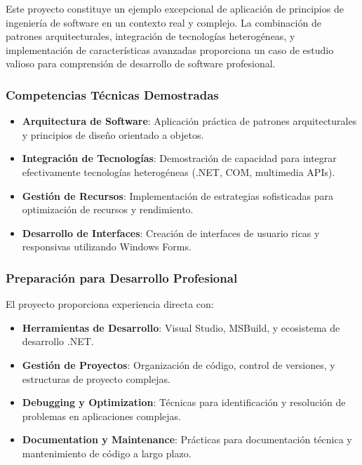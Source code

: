\documentclass[a4paper]{article}
\begin{document}
Este proyecto constituye un ejemplo excepcional de aplicación de principios de ingeniería de software en un contexto real y complejo. La combinación de patrones arquitecturales, integración de tecnologías heterogéneas, y implementación de características avanzadas proporciona un caso de estudio valioso para comprensión de desarrollo de software profesional.

\subsubsection{Competencias Técnicas Demostradas}

\begin{itemize}
\item \textbf{Arquitectura de Software}: Aplicación práctica de patrones arquitecturales y principios de diseño orientado a objetos.

\item \textbf{Integración de Tecnologías}: Demostración de capacidad para integrar efectivamente tecnologías heterogéneas (.NET, COM, multimedia APIs).

\item \textbf{Gestión de Recursos}: Implementación de estrategias sofisticadas para optimización de recursos y rendimiento.

\item \textbf{Desarrollo de Interfaces}: Creación de interfaces de usuario ricas y responsivas utilizando Windows Forms.
\end{itemize}

\subsubsection{Preparación para Desarrollo Profesional}

El proyecto proporciona experiencia directa con:

\begin{itemize}
\item \textbf{Herramientas de Desarrollo}: Visual Studio, MSBuild, y ecosistema de desarrollo .NET.

\item \textbf{Gestión de Proyectos}: Organización de código, control de versiones, y estructuras de proyecto complejas.

\item \textbf{Debugging y Optimization}: Técnicas para identificación y resolución de problemas en aplicaciones complejas.

\item \textbf{Documentation y Maintenance}: Prácticas para documentación técnica y mantenimiento de código a largo plazo.
\end{itemize}
\end{document}

